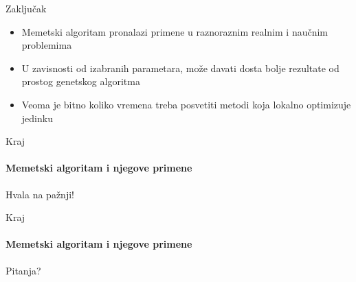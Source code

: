\documentclass{beamer}
\begin{document}
\begin{frame}[fragile]{Zaključak}
  
   \begin{itemize}
    \item{Memetski algoritam pronalazi primene u raznoraznim realnim i naučnim problemima}
    \item{U zavisnosti od izabranih parametara, može davati dosta bolje rezultate od prostog genetskog algoritma}
    \item{Veoma je bitno koliko vremena treba posvetiti metodi koja lokalno optimizuje jedinku}
    
    \end{itemize}
\end{frame}


\begin{frame}{Kraj}
  \framesubtitle{Memetski algoritam i njegove primene}

  
\centering
\Huge{Hvala na pažnji!}

\end{frame}




\begin{frame}{Kraj}
  \framesubtitle{Memetski algoritam i njegove primene}
\centering
\Huge{Pitanja?}

\end{frame}
\end{document}
